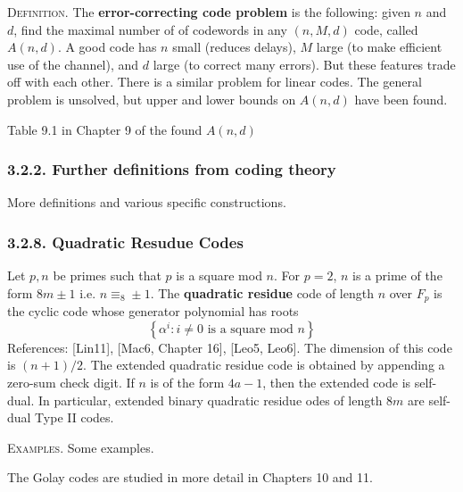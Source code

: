 \documentclass{article}
\renewcommand{\tt}[1]{\text{ #1 }}
\renewcommand{\=}{\equiv}
\newcommand{\set}[1]{\left\{ #1 \right\}}
\newcommand{\header}[1]{\vspace{1em}\noindent\textsc{#1.} }
\begin{document}
\header{Definition}
The \textbf{error-correcting code problem} is the following: given $n$ and $d$, find the maximal number of of codewords in any $(n, M, d)$ code, called $A(n, d)$.
A good code has $n$ small (reduces delays), $M$ large (to make efficient use of the channel), and $d$ large (to correct many errors). But these features trade off with each other.
There is a similar problem for linear codes.
The general problem is unsolved, but upper and lower bounds on $A(n, d)$ have been found.

\begin{center}
  Table 9.1 in Chapter 9 of the found $A(n, d)$
\end{center}

\subsubsection*{3.2.2. Further definitions from coding theory}

More definitions and various specific constructions.

\subsubsection*{3.2.8. Quadratic Resudue Codes}

Let $p, n$ be primes such that $p$ is a square mod $n$.
For $p = 2$, $n$ is a prime of the form $8m \pm 1$ i.e. $n \=_8 \pm 1$.
The \textbf{quadratic residue} code of length $n$ over $F_p$ is the cyclic code whose generator polynomial has roots
$$\set{ \alpha^i : i \neq 0 \tt{is a square mod} n }$$
References: [Lin11], [Mac6, Chapter 16], [Leo5, Leo6].
The dimension of this code is $(n+1)/2$.
The extended quadratic residue code is obtained by appending a zero-sum check digit. If $n$ is of the form $4a - 1$, then the extended code is self-dual. In particular, extended binary quadratic residue odes of length $8m$ are self-dual Type II codes.

\header{Examples}
Some examples.

The Golay codes are studied in more detail in Chapters 10 and 11.
\end{document}
